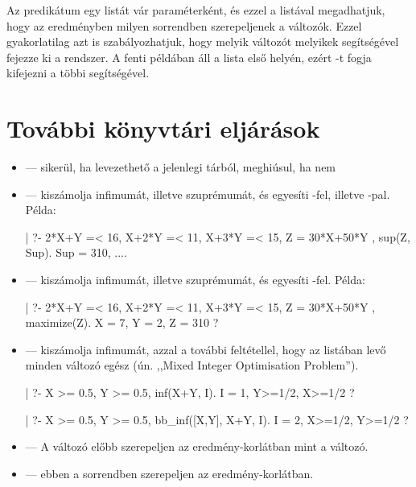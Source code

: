 Az  predikátum egy listát vár paraméterként, és ezzel a
listával megadhatjuk, hogy az eredményben milyen sorrendben szerepeljenek
a változók. Ezzel gyakorlatilag azt is szabályozhatjuk, hogy melyik változót
melyikek segítségével fejezze ki a rendszer. A fenti példában  áll a
lista első helyén, ezért -t fogja kifejezni a többi segítségével.

\section{További könyvtári eljárások}

\begin{itemize}
\item {} --- sikerül, ha  levezethető a
jelenlegi tárból, meghiúsul, ha nem

\item {} --- kiszámolja  infimumát,
illetve szuprémumát, és egyesíti -fel, illetve -pal.
Példa:

\begin{prologcode}
| ?- { 2*X+Y =< 16, X+2*Y =< 11, X+3*Y =< 15, Z = 30*X+50*Y }, sup(Z, Sup).
Sup = 310, {....}
\end{prologcode}

\item {} --- kiszámolja  infimumát,
illetve szuprémumát, és egyesíti -fel. Példa:

\begin{prologcode}
| ?- { 2*X+Y =< 16, X+2*Y =< 11, X+3*Y =< 15, Z = 30*X+50*Y }, maximize(Z).
X = 7, Y = 2, Z = 310 ?
\end{prologcode}

\item {} --- kiszámolja  infimumát,
azzal a további feltétellel, hogy az  listában levő minden
változó egész (ún. ,,Mixed Integer Optimisation Problem'').

\begin{prologcode}
| ?- {X >= 0.5, Y >= 0.5}, inf(X+Y, I).
I = 1, {Y>=1/2}, {X>=1/2} ?

| ?- {X >= 0.5, Y >= 0.5}, bb_inf([X,Y], X+Y, I).
I = 2, {X>=1/2}, {Y>=1/2} ?
\end{prologcode}

\item {} --- A  változó előbb szerepeljen az
eredmény-korlátban mint a  változó.

\item {} ---  ebben a sorrendben
szerepeljen az eredmény-korlátban.

\end{itemize}

